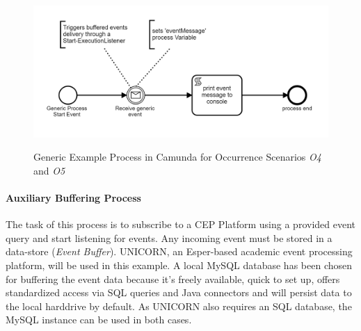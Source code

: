 \begin{figure}[]
	\myfloatalign
	{\includegraphics[width=1\linewidth]{chapters/assessment/example-o4-o5.PNG}}
	\caption{Generic Example Process in Camunda for Occurrence Scenarios \textit{O4} and \textit{O5}}\label{fig:camunda-example-o4-o5}
\end{figure}

\paragraph{Auxiliary Buffering Process}
The task of this process is to subscribe to a CEP Platform using a provided event query and start listening for events. Any incoming event must be stored in a data-store (\textit{Event Buffer}).
UNICORN, an Esper-based academic event processing platform, will be used in this example.
A local MySQL database has been chosen for buffering the event data because it's freely available, quick to set up, offers standardized access via SQL queries and Java connectors and will persist data to the local harddrive by default. As UNICORN also requires an SQL database, the MySQL instance can be used in both cases.

